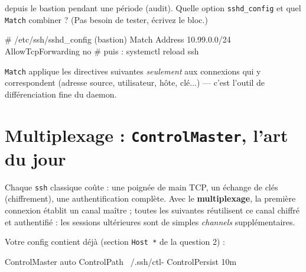 \documentclass[a4paper,10pt]{exam}
\begin{document}
\begin{questions}
depuis le bastion pendant une période (audit). Quelle option \texttt{sshd\_config} et quel
\texttt{Match} combiner ? (Pas besoin de tester, écrivez le bloc.)
\begin{solution}
\begin{bashcode}
# /etc/ssh/sshd_config (bastion)
Match Address 10.99.0.0/24
    AllowTcpForwarding no
# puis :
systemctl reload ssh
\end{bashcode}
\texttt{Match} applique les directives suivantes \emph{seulement} aux connexions qui y
correspondent (adresse source, utilisateur, hôte, clé...) — c'est l'outil de
différenciation fine du daemon.
\end{solution}
\end{questions}

\section{Multiplexage : \texttt{ControlMaster}, l'art du jour}

Chaque \texttt{ssh} classique coûte : une poignée de main TCP, un échange de clés
(chiffrement), une authentification complète. Avec le \textbf{multiplexage}, la première
connexion établit un canal maître ; toutes les suivantes réutilisent ce canal chiffré et
authentifié : les sessions ultérieures sont de simples \emph{channels} supplémentaires.

Votre config contient déjà (section \texttt{Host *} de la question 2) :
\begin{bashcode}
ControlMaster auto
ControlPath ~/.ssh/ctl-%
ControlPersist 10m
\end{bashcode}
\end{document}
